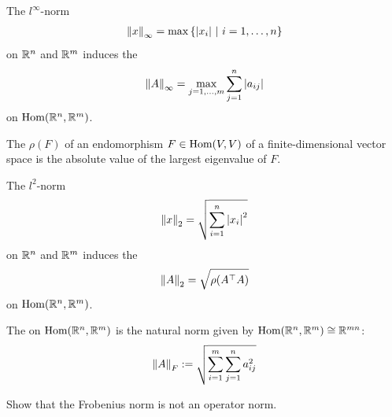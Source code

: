 \begin{proposition}
	The $l^\infty$-norm
	\begin{align*}
		\norm{x}_\infty = \max \qty{\abs{x_i} ~\middle|~i = 1, \hdots, n}
	\end{align*} 
	on $\mathbb{R}^n$ and $\mathbb{R}^m$ induces the 
	\begin{align*}
		\norm{A}_\infty = \max_{j = 1, \hdots, m} \sum_{j = 1}^n \abs{a_{ij}}
	\end{align*}
	on $\textnormal{Hom}(\mathbb{R}^n, \mathbb{R}^m)$.
\end{proposition}
\begin{importantdefinition}{}{}
	The  $\rho(F)$ of an endomorphism $F \in \textnormal{Hom}(V,V)$ of a finite-dimensional vector space is the absolute value of the largest eigenvalue of $F$.
\end{importantdefinition}
\begin{proposition}
	The $l^2$-norm
	\begin{align*}
		\norm{x}_2 = \sqrt{\sum_{i = 1}^n \abs{x_i}^2}
	\end{align*} 
	on $\mathbb{R}^n$ and $\mathbb{R}^m$ induces the 
	\begin{align*}
		\norm{A}_2 = \sqrt{\rho(A^\top A)}
	\end{align*}
	on $\textnormal{Hom}(\mathbb{R}^n, \mathbb{R}^m)$.
\end{proposition}
\begin{definition}
	The  on $\textnormal{Hom}(\mathbb{R}^n, \mathbb{R}^m)$ is the natural norm given by $\textnormal{Hom}(\mathbb{R}^n, \mathbb{R}^m) \cong \mathbb{R}^{mn}$:
	\begin{align*}
		\norm{A}_F := \sqrt{\sum_{i = 1}^m \sum_{j = 1}^n a_{ij}^2}
	\end{align*}
\end{definition}
\begin{exercise}
	Show that the Frobenius norm is not an operator norm.
\end{exercise}


